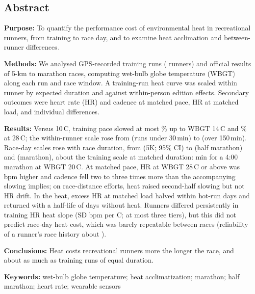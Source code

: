 \documentclass[12pt]{article}
\newcommand{\degC}{\,\textdegree C}
\newcommand{\bpmC}{bpm per \textdegree C}
\begin{document}
\begin{onehalfspace}
\section*{Abstract}
\noindent\textbf{Purpose:} To quantify the performance cost of environmental heat in recreational runners, from training to race day, and to examine heat acclimation and between-runner differences.

\noindent\textbf{Methods:} We analysed \nRuns{} GPS-recorded training runs (\nRunners{} runners) and official results of 5-km to marathon races, computing wet-bulb globe temperature (WBGT) along each run and race window. A training-run heat curve was scaled within runner by expected duration and against within-person edition effects. Secondary outcomes were heart rate (HR) and cadence at matched pace, HR at matched load, and individual differences.

\noindent\textbf{Results:} Versus 10\degC, training pace slowed at most \cFourteen\% up to WBGT 14\degC{} and \cTwentyeight\% at 28\degC; the within-runner scale rose from \scLtThirtyPt{} (runs under 30\,min) to \scGtOneFiftyPt{} (over 150\,min). Race-day scales rose with race duration, from \alphaFiveK{} (5K; 95\% CI) to \alphaHalfCI{} (half marathon) and \alphaMarCI{} (marathon), about \ratioRound{} the training scale at matched duration: \marMinTwenty{} min for a 4:00 marathon at WBGT 20\degC. At matched pace, HR at WBGT 28\degC{} or above was \mechHRHot{} bpm higher and cadence fell two to three times more than the accompanying slowing implies; on race-distance efforts, heat raised second-half slowing but not HR drift. In the heat, excess HR at matched load halved within \kinOnsetHalf{} hot-run days and returned with a half-life of \kinDecayHalf{} days without heat. Runners differed persistently in training HR heat slope (SD \sdPersistent{} \bpmC; at most three tiers), but this did not predict race-day heat cost, which was barely repeatable between races (reliability of a runner's race history about \persistRel).

\noindent\textbf{Conclusions:} Heat costs recreational runners more the longer the race, and about \ratioRound{} as much as training runs of equal duration.

\vspace{0.6em}
\noindent\textbf{Keywords:} wet-bulb globe temperature; heat acclimatization; marathon; half marathon; heart rate; wearable sensors
\end{onehalfspace}
\end{document}
